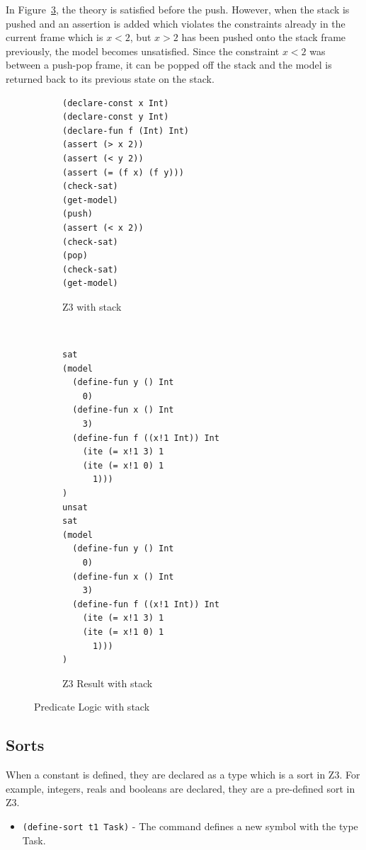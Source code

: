 \documentclass[a4paper]{report}
\begin{document}
In Figure~\ref{fig:Predicate Logic with stack}, the theory is satisfied before the push. However, when the stack is pushed and an assertion is added which violates the constraints already in the current frame which is $x < 2$, but $x > 2$ has been pushed onto the stack frame previously, the model becomes unsatisfied. Since the constraint $x < 2$ was between a push-pop frame, it can be popped off the stack and the model is returned back to its previous state on the stack.\\
\begin{figure}[!htb]
\centering
\begin{subfigure}[b]{\textwidth}
\lstset{numbers=left, showspaces=false,
    showstringspaces=false, tabsize=2, breaklines=true,
    xleftmargin=5.0ex,
}
\centering
\begin{lstlisting}[frame=single]
(declare-const x Int)
(declare-const y Int)
(declare-fun f (Int) Int)
(assert (> x 2))
(assert (< y 2))
(assert (= (f x) (f y)))
(check-sat)
(get-model)
(push)
(assert (< x 2))
(check-sat)
(pop)
(check-sat)
(get-model)
\end{lstlisting}
\caption{Z3 with stack}
\label{fig:Z3 with stack}
\end{subfigure}\\
\begin{subfigure}[b]{\textwidth}
\begin{lstlisting}[frame=single]
sat
(model 
  (define-fun y () Int
    0)
  (define-fun x () Int
    3)
  (define-fun f ((x!1 Int)) Int
    (ite (= x!1 3) 1
    (ite (= x!1 0) 1
      1)))
)
unsat
sat
(model 
  (define-fun y () Int
    0)
  (define-fun x () Int
    3)
  (define-fun f ((x!1 Int)) Int
    (ite (= x!1 3) 1
    (ite (= x!1 0) 1
      1)))
)
\end{lstlisting}
\caption{Z3 Result with stack}
\label{fig:Z3 Function stack}
\end{subfigure}
\caption{Predicate Logic with stack}
\label{fig:Predicate Logic with stack}
\end{figure} 

\subsection{Sorts}
When a constant is defined, they are declared as a type which is a sort in Z3. For example, integers, reals and booleans are declared, they are a pre-defined sort in Z3. 
\begin{itemize}
\item \texttt{(define-sort t1 Task)} - The command defines a new symbol with the type Task.
\end{itemize}
\end{document}
